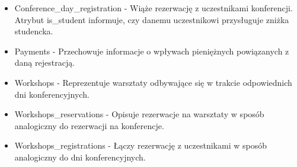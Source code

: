 \documentclass{article}
\begin{document}
\begin{itemize}
            \item Conference\_day\_registration - Wiąże rezerwację z uczestnikami konferencji. Atrybut is\_student informuje, czy danemu uczestnikowi przysługuje zniżka studencka. 
            
            \item Payments - Przechowuje informacje o wpływach pieniężnych powiązanych z daną rejestracją. 
            
            \item Workshops - Reprezentuje warsztaty odbywające się w trakcie odpowiednich dni konferencyjnych.
            
            \item Workshops\_reservations - Opisuje rezerwacje na warsztaty w sposób analogiczny do rezerwacji na konferencje. 
            
            \item Workshops\_registrations - Łączy rezerwację z uczestnikami w sposób analogiczny do dni konferencyjnych.
            
        \end{itemize}
        
\end{document}
